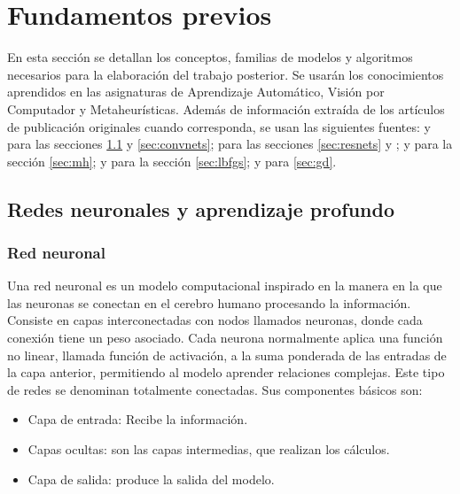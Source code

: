 \section{Fundamentos previos}
En esta sección se detallan los conceptos, familias de modelos y algoritmos necesarios para la elaboración del trabajo posterior. Se usarán los conocimientos aprendidos en las asignaturas de Aprendizaje Automático, Visión por Computador y Metaheurísticas. Además de información extraída de los artículos de publicación originales cuando corresponda, se usan las siguientes fuentes: \cite{GoodFellowBook} y \cite{stanford_231} para las secciones \ref{sec:profundo} y \ref{sec:convnets}; \cite{divedeeplearning} para las secciones \ref{sec:resnets} y ; \cite{mhhandbook} y \cite{diffevbook} para la sección \ref{sec:mh}; \cite{numerical_optimization} y \cite{stanford_231} para la sección \ref{sec:lbfgs}; \cite{divedeeplearning} y \cite{GoodFellowBook} para \ref{sec:gd}.


\subsection{Redes neuronales y aprendizaje profundo}
\label{sec:profundo}

\subsubsection{Red neuronal}

Una red neuronal es un modelo computacional inspirado en la manera en la que las neuronas se conectan en el cerebro humano procesando la información. Consiste en capas interconectadas con nodos llamados neuronas, donde cada conexión tiene un peso asociado. Cada neurona normalmente aplica una función no linear, llamada función de activación, a la suma ponderada de las entradas de la capa anterior, permitiendo al modelo aprender relaciones complejas. Este tipo de redes se denominan totalmente conectadas. Sus componentes básicos son:

\begin{itemize}
	\item Capa de entrada: Recibe la información.
	
	\item Capas ocultas: son las capas intermedias, que realizan los cálculos.
	
	\item Capa de salida: produce la salida del modelo.
\end{itemize}

